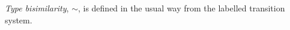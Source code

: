 \emph{Type bisimilarity}, $\sim$, is defined in the usual way from the
labelled transition system.


